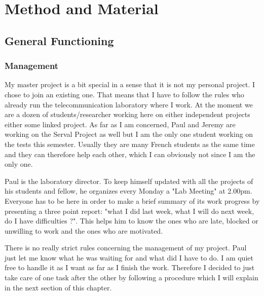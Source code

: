 \chapter{Method and Material}

\section{General Functioning}
\subsection{Management}
My master project is a bit special in a sense that it is not my personal project. I chose to join an existing one. That means that I have to follow the rules who already run the telecommunication laboratory where I work. At the moment we are a dozen of students/researcher working here on either independent projects either some linked project. As far as I am concerned, Paul and Jeremy are working on the Serval Project as well but I am the only one student working on the tests this semester. Usually they are many French students as the same time and they can therefore help each other, which I can obviously not since I am the only one.

\par
Paul is the laboratory director. To keep himself updated with all the projects of his students and fellow, he organizes every Monday a "Lab Meeting" at 2.00pm. Everyone has to be here in order to make a brief summary of its work progress by presenting a three point report: "what I did last week, what I will do next week, do I have difficulties ?". This helps him to know the ones who are late, blocked or unwilling to work and the ones who are motivated.

\par
There is no really strict rules concerning the management of my project. Paul just let me know what he was waiting for and what did I have to do. I am quiet free to handle it as I want as far as I finish the work. Therefore I decided to just take care of one task after the other by following a procedure which I will explain in the next section of this chapter. 

